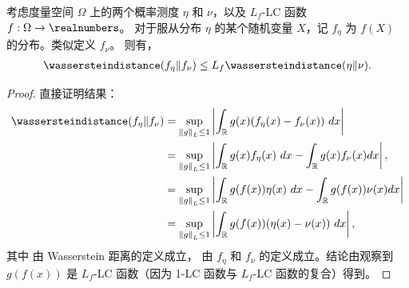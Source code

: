 \begin{prop}
\label{pp:wass_dist_lip_g}
    考虑度量空间 $\Omega$ 上的两个概率测度 $\eta$ 和 $\nu$，以及 $L_f$-LC 函数 $f:\Omega\rightarrow \realnumbers$。
    对于服从分布 $\eta$ 的某个随机变量 $X$，记 $f_\eta$ 为 $f(X)$ 的分布。类似定义 $f_\nu$。
    则有，
    \begin{align*}
        \wassersteindistance(f_{\eta}\Vert f_{\nu})\leq L_f \wassersteindistance(\eta \Vert \nu).
    \end{align*}
\end{prop}
\begin{proof}
    直接证明结果：
    \begin{align}
        \wassersteindistance(f_{\eta}\Vert f_{\nu})
        &= \sup_{\left\Vert g\right\Vert_L\leq 1}\left\vert\int_{\mathbb R} g(x)(f_{\eta}(x)-f_{\nu}(x)) ~dx\right\vert
        \label{eq:def_wass_f}
        \\
        &=\sup_{\left\Vert g\right\Vert_L\leq 1}
        \left\vert\int_{\mathbb R} g(x)f_{\eta}(x)~dx-\int_{\mathbb R} g(x)f_{\nu}(x) dx\right\vert,\nonumber
        \\
        &= \sup_{\left\Vert g\right\Vert_L\leq 1}
        \left\vert\int_{\mathbb R} g(f(x))\eta(x) ~dx-\int_{\mathbb R} g(f(x)) \nu(x) dx\right\vert\label{eq:def_eta_nu}
        \\
        &= \sup_{\left\Vert g\right\Vert_L\leq 1}
        \left\vert \int_{\mathbb R} g(f(x))(\eta(x) - \nu(x)) ~dx\right\vert,\nonumber
    \end{align}
    其中  由 Wasserstein 距离的定义成立， 由 $f_\eta$ 和 $f_\nu$ 的定义成立。结论由观察到 $g(f(x))$ 是 $L_f$-LC 函数（因为 1-LC 函数与 $L_f$-LC 函数的复合）得到。
\end{proof}

